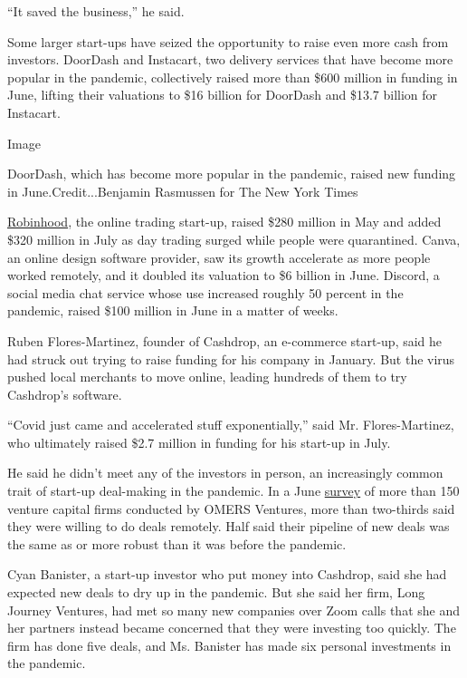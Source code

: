 ``It saved the business,'' he said.

Some larger start-ups have seized the opportunity to raise even more
cash from investors. DoorDash and Instacart, two delivery services that
have become more popular in the pandemic, collectively raised more than
\$600 million in funding in June, lifting their valuations to \$16
billion for DoorDash and \$13.7 billion for Instacart.

Image

DoorDash, which has become more popular in the pandemic, raised new
funding in June.Credit...Benjamin Rasmussen for The New York Times

\href{https://www.nytimes3xbfgragh.onion/2020/07/08/technology/robinhood-risky-trading.html}{Robinhood},
the online trading start-up, raised \$280 million in May and added \$320
million in July as day trading surged while people were quarantined.
Canva, an online design software provider, saw its growth accelerate as
more people worked remotely, and it doubled its valuation to \$6 billion
in June. Discord, a social media chat service whose use increased
roughly 50 percent in the pandemic, raised \$100 million in June in a
matter of weeks.

Ruben Flores-Martinez, founder of Cashdrop, an e-commerce start-up, said
he had struck out trying to raise funding for his company in January.
But the virus pushed local merchants to move online, leading hundreds of
them to try Cashdrop's software.

``Covid just came and accelerated stuff exponentially,'' said Mr.
Flores-Martinez, who ultimately raised \$2.7 million in funding for his
start-up in July.

He said he didn't meet any of the investors in person, an increasingly
common trait of start-up deal-making in the pandemic. In a June
\href{https://medium.com/omers-ventures/we-asked-over-150-vcs-if-they-are-doing-remote-deals-heres-what-they-said-970764b920fc}{survey}
of more than 150 venture capital firms conducted by OMERS Ventures, more
than two-thirds said they were willing to do deals remotely. Half said
their pipeline of new deals was the same as or more robust than it was
before the pandemic.

Cyan Banister, a start-up investor who put money into Cashdrop, said she
had expected new deals to dry up in the pandemic. But she said her firm,
Long Journey Ventures, had met so many new companies over Zoom calls
that she and her partners instead became concerned that they were
investing too quickly. The firm has done five deals, and Ms. Banister
has made six personal investments in the pandemic.

